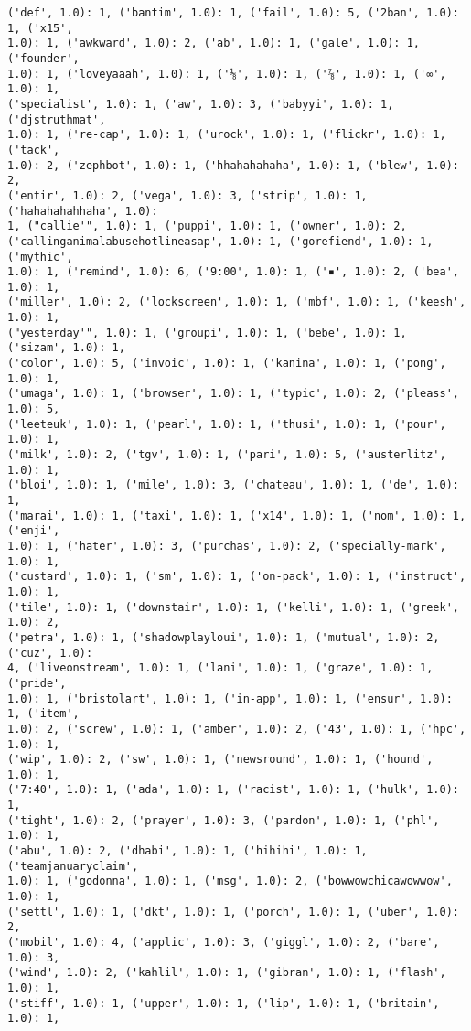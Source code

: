 \documentclass[11pt]{article}
\begin{document}
\begin{Verbatim}[commandchars=\\\{\}]
('def', 1.0): 1, ('bantim', 1.0): 1, ('fail', 1.0): 5, ('2ban', 1.0): 1, ('x15',
1.0): 1, ('awkward', 1.0): 2, ('ab', 1.0): 1, ('gale', 1.0): 1, ('founder',
1.0): 1, ('loveyaaah', 1.0): 1, ('⅛', 1.0): 1, ('⅞', 1.0): 1, ('∞', 1.0): 1,
('specialist', 1.0): 1, ('aw', 1.0): 3, ('babyyi', 1.0): 1, ('djstruthmat',
1.0): 1, ('re-cap', 1.0): 1, ('urock', 1.0): 1, ('flickr', 1.0): 1, ('tack',
1.0): 2, ('zephbot', 1.0): 1, ('hhahahahaha', 1.0): 1, ('blew', 1.0): 2,
('entir', 1.0): 2, ('vega', 1.0): 3, ('strip', 1.0): 1, ('hahahahahhaha', 1.0):
1, ("callie'", 1.0): 1, ('puppi', 1.0): 1, ('owner', 1.0): 2,
('callinganimalabusehotlineasap', 1.0): 1, ('gorefiend', 1.0): 1, ('mythic',
1.0): 1, ('remind', 1.0): 6, ('9:00', 1.0): 1, ('▪', 1.0): 2, ('bea', 1.0): 1,
('miller', 1.0): 2, ('lockscreen', 1.0): 1, ('mbf', 1.0): 1, ('keesh', 1.0): 1,
("yesterday'", 1.0): 1, ('groupi', 1.0): 1, ('bebe', 1.0): 1, ('sizam', 1.0): 1,
('color', 1.0): 5, ('invoic', 1.0): 1, ('kanina', 1.0): 1, ('pong', 1.0): 1,
('umaga', 1.0): 1, ('browser', 1.0): 1, ('typic', 1.0): 2, ('pleass', 1.0): 5,
('leeteuk', 1.0): 1, ('pearl', 1.0): 1, ('thusi', 1.0): 1, ('pour', 1.0): 1,
('milk', 1.0): 2, ('tgv', 1.0): 1, ('pari', 1.0): 5, ('austerlitz', 1.0): 1,
('bloi', 1.0): 1, ('mile', 1.0): 3, ('chateau', 1.0): 1, ('de', 1.0): 1,
('marai', 1.0): 1, ('taxi', 1.0): 1, ('x14', 1.0): 1, ('nom', 1.0): 1, ('enji',
1.0): 1, ('hater', 1.0): 3, ('purchas', 1.0): 2, ('specially-mark', 1.0): 1,
('custard', 1.0): 1, ('sm', 1.0): 1, ('on-pack', 1.0): 1, ('instruct', 1.0): 1,
('tile', 1.0): 1, ('downstair', 1.0): 1, ('kelli', 1.0): 1, ('greek', 1.0): 2,
('petra', 1.0): 1, ('shadowplayloui', 1.0): 1, ('mutual', 1.0): 2, ('cuz', 1.0):
4, ('liveonstream', 1.0): 1, ('lani', 1.0): 1, ('graze', 1.0): 1, ('pride',
1.0): 1, ('bristolart', 1.0): 1, ('in-app', 1.0): 1, ('ensur', 1.0): 1, ('item',
1.0): 2, ('screw', 1.0): 1, ('amber', 1.0): 2, ('43', 1.0): 1, ('hpc', 1.0): 1,
('wip', 1.0): 2, ('sw', 1.0): 1, ('newsround', 1.0): 1, ('hound', 1.0): 1,
('7:40', 1.0): 1, ('ada', 1.0): 1, ('racist', 1.0): 1, ('hulk', 1.0): 1,
('tight', 1.0): 2, ('prayer', 1.0): 3, ('pardon', 1.0): 1, ('phl', 1.0): 1,
('abu', 1.0): 2, ('dhabi', 1.0): 1, ('hihihi', 1.0): 1, ('teamjanuaryclaim',
1.0): 1, ('godonna', 1.0): 1, ('msg', 1.0): 2, ('bowwowchicawowwow', 1.0): 1,
('settl', 1.0): 1, ('dkt', 1.0): 1, ('porch', 1.0): 1, ('uber', 1.0): 2,
('mobil', 1.0): 4, ('applic', 1.0): 3, ('giggl', 1.0): 2, ('bare', 1.0): 3,
('wind', 1.0): 2, ('kahlil', 1.0): 1, ('gibran', 1.0): 1, ('flash', 1.0): 1,
('stiff', 1.0): 1, ('upper', 1.0): 1, ('lip', 1.0): 1, ('britain', 1.0): 1,

\end{Verbatim}
\end{document}
